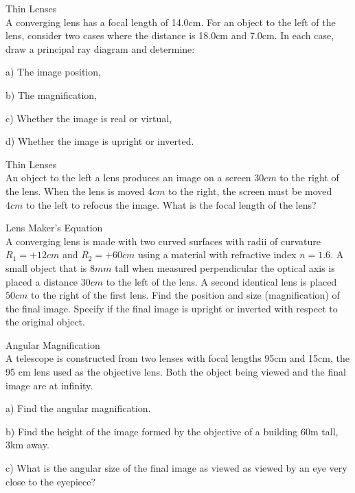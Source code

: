 \documentclass[10pt]{article}
\newenvironment{problem}[2][Problem]{\begin{trivlist}
\item[\hskip \labelsep {\bfseries #1}\hskip \labelsep {\bfseries #2.}]}{\end{trivlist}}
\begin{document}
\begin{problem}{5} Thin Lenses\\
A converging lens has a focal length of 14.0cm. For an object to the left of the lens, consider two cases where the distance is 18.0cm and 7.0cm. In each case, draw a principal ray diagram and determine:
\item a) The image position,
\item b) The magnification,
\item c) Whether the image is real or virtual,
\item d) Whether the image is upright or inverted.
\end{problem}

\begin{problem}{6} Thin Lenses\\
An object to the left a lens produces an image on a screen $30cm$ to the right of the lens. When the lens is moved $4cm$ to the right, the screen must be moved $4cm$ to the left to refocus the image. What is the focal length of the lens?
\end{problem}

\begin{problem}{7} Lens Maker's Equation\\
A converging lens is made with two curved surfaces with radii of curvature $R_1=+12cm$ and $R_2=+60cm$ using a material with refractive index $n=1.6$. A small object that is $8mm$ tall when measured perpendicular the optical axis is placed a distance $30cm$ to the left of the lens. A second identical lens is placed $50cm$ to the right of the first lens. Find the position and size (magnification) of the final image. Specify if the final image is upright or inverted with respect to the original object.
\end{problem}

\begin{problem}{8} Angular Magnification\\
A telescope is constructed from two lenses with focal lengths 95cm and 15cm, the 95 cm lens used as the objective lens. Both the object being viewed and the final image are at infinity.
\item a) Find the angular magnification.
\item b) Find the height of the image formed by the objective of a building 60m tall, 3km away.
\item c) What is the angular size of the final image as viewed as viewed by an eye very close to the eyepiece?
\end{problem}







\end{document}
